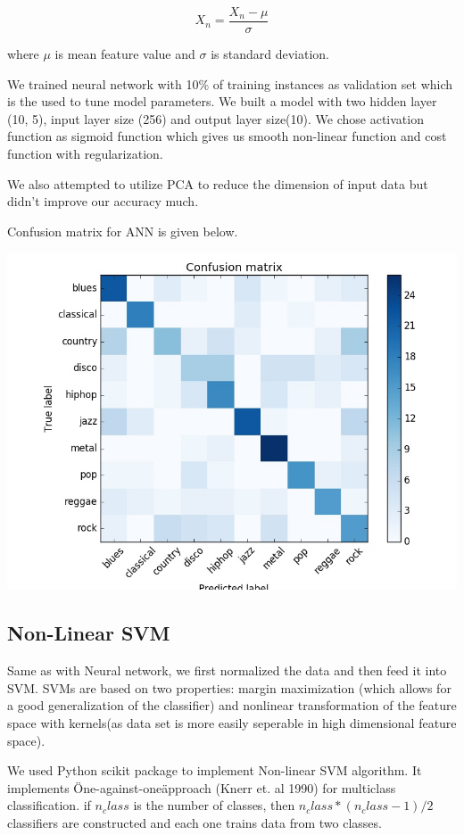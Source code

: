 \documentclass[conference]{IEEEtran}
\begin{document}
$$ X_n = \frac{X_n - \mu}{\sigma}$$

where $\mu$ is mean feature value and $ \sigma $ is standard deviation.

We trained neural network with 10\% of training instances as validation set which is the used to tune model parameters. We built a model with two hidden layer (10, 5), input layer size (256) and output layer size(10). We chose activation function as sigmoid function which gives us smooth non-linear function and cost function with regularization.


We also attempted to utilize PCA to reduce the dimension of input data but didn't improve our accuracy much.

Confusion matrix for ANN is given below.

\includegraphics[width=\columnwidth]{ANN}
\subsection{Non-Linear SVM}
\label{subs:Non-Linear SVM}
Same as with Neural network, we first normalized the data and then feed it into SVM. SVMs are based on two properties: margin maximization (which allows for a good generalization of the classifier) and nonlinear transformation of the feature space with kernels(as data set is more easily seperable in high dimensional feature space).


We used Python scikit package to implement Non-linear SVM algorithm. It implements \"One-against-one\" approach (Knerr et. al 1990) for multiclass classification. if $n_class$ is the number of classes, then $n_class * (n_class - 1 ) / 2$ classifiers are constructed and each one trains data from two classes.
\end{document}
